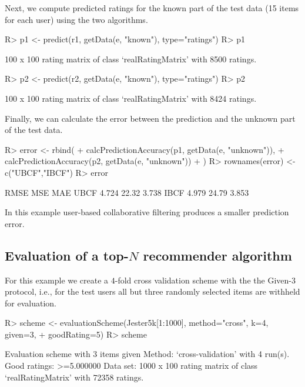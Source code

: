 \documentclass[nojss]{jss}
\begin{document}
Next, we compute predicted ratings for the known part of the test data (15 items
for each user) using
the two algorithms.

\begin{Schunk}
\begin{Sinput}
R> p1 <- predict(r1, getData(e, "known"), type="ratings")
R> p1
\end{Sinput}
\begin{Soutput}
100 x 100 rating matrix of class ‘realRatingMatrix’ with 8500 ratings.
\end{Soutput}
\begin{Sinput}
R> p2 <- predict(r2, getData(e, "known"), type="ratings")
R> p2
\end{Sinput}
\begin{Soutput}
100 x 100 rating matrix of class ‘realRatingMatrix’ with 8424 ratings.
\end{Soutput}
\end{Schunk}

Finally, we can calculate the error between the prediction and the
unknown part of the test data.

\begin{Schunk}
\begin{Sinput}
R> error <- rbind(
+   calcPredictionAccuracy(p1, getData(e, "unknown")),
+   calcPredictionAccuracy(p2, getData(e, "unknown"))
+ )
R> rownames(error) <- c("UBCF","IBCF")
R> error
\end{Sinput}
\begin{Soutput}
      RMSE   MSE   MAE
UBCF 4.724 22.32 3.738
IBCF 4.979 24.79 3.853
\end{Soutput}
\end{Schunk}

In this example user-based collaborative filtering produces a smaller
prediction error.

\subsection{Evaluation of a top-$N$ recommender algorithm}

For this example we create a $4$-fold cross validation scheme
with the the Given-3 protocol, i.e.,
for the test users all but three randomly selected items are withheld
for evaluation.

\begin{Schunk}
\begin{Sinput}
R> scheme <- evaluationScheme(Jester5k[1:1000], method="cross", k=4, given=3,
+     goodRating=5)
R> scheme
\end{Sinput}
\begin{Soutput}
Evaluation scheme with 3 items given
Method: ‘cross-validation’ with 4 run(s).
Good ratings: >=5.000000
Data set: 1000 x 100 rating matrix of class ‘realRatingMatrix’ with 72358 ratings.
\end{Soutput}
\end{Schunk}
\end{document}
